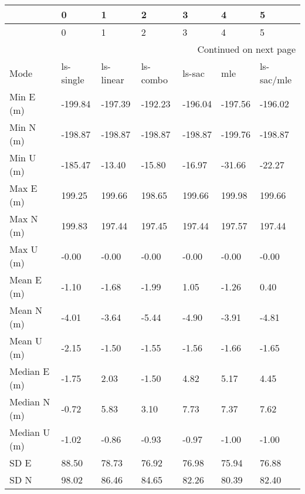 \begin{longtable}{lllllll}
\toprule
{} &          0 &          1 &         2 &        3 &        4 &           5 \\
\midrule
\endfirsthead

\toprule
{} &          0 &          1 &         2 &        3 &        4 &           5 \\
\midrule
\endhead
\midrule
\multicolumn{7}{r}{{Continued on next page}} \\
\midrule
\endfoot

\bottomrule
\endlastfoot
Mode              &  ls-single &  ls-linear &  ls-combo &   ls-sac &      mle &  ls-sac/mle \\
Min E (m)         &    -199.84 &    -197.39 &   -192.23 &  -196.04 &  -197.56 &     -196.02 \\
Min N (m)         &    -198.87 &    -198.87 &   -198.87 &  -198.87 &  -199.76 &     -198.87 \\
Min U (m)         &    -185.47 &     -13.40 &    -15.80 &   -16.97 &   -31.66 &      -22.27 \\
Max E (m)         &     199.25 &     199.66 &    198.65 &   199.66 &   199.98 &      199.66 \\
Max N (m)         &     199.83 &     197.44 &    197.45 &   197.44 &   197.57 &      197.44 \\
Max U (m)         &      -0.00 &      -0.00 &     -0.00 &    -0.00 &    -0.00 &       -0.00 \\
Mean E (m)        &      -1.10 &      -1.68 &     -1.99 &     1.05 &    -1.26 &        0.40 \\
Mean N (m)        &      -4.01 &      -3.64 &     -5.44 &    -4.90 &    -3.91 &       -4.81 \\
Mean U (m)        &      -2.15 &      -1.50 &     -1.55 &    -1.56 &    -1.66 &       -1.65 \\
Median E (m)      &      -1.75 &       2.03 &     -1.50 &     4.82 &     5.17 &        4.45 \\
Median N (m)      &      -0.72 &       5.83 &      3.10 &     7.73 &     7.37 &        7.62 \\
Median U (m)      &      -1.02 &      -0.86 &     -0.93 &    -0.97 &    -1.00 &       -1.00 \\
SD E              &      88.50 &      78.73 &     76.92 &    76.98 &    75.94 &       76.88 \\
SD N              &      98.02 &      86.46 &     84.65 &    82.26 &    80.39 &       82.40 \\

\end{longtable}
